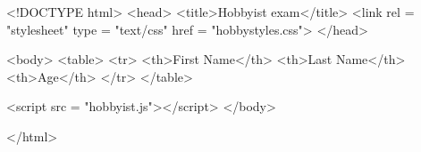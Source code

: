 <!DOCTYPE html>
<head>
	<title>Hobbyist exam</title>
	<link rel = "stylesheet" type = "text/css" href = "hobbystyles.css">
</head>

<body>
<table>
	<tr>
		<th>First Name</th>
		<th>Last Name</th>
		<th>Age</th>
	</tr>
</table>

<script src = "hobbyist.js"></script>
</body>

</html>